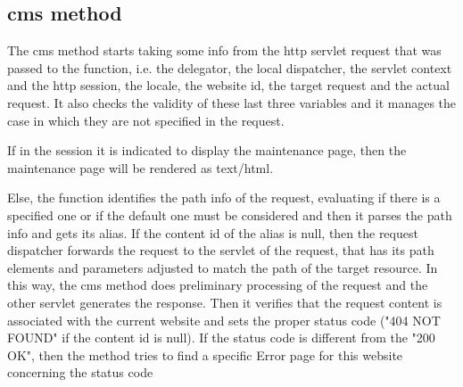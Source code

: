 \subsection{cms method}

The cms method starts taking some info from the http servlet request that was passed to the function, i.e. the delegator, the local dispatcher, the servlet context and the http session, the locale, the website id, the target request and the actual request. It also checks the validity of these last three variables and it manages the case in which they are not specified in the request.

If in the session it is indicated to display the maintenance page, then the maintenance page will be rendered as text/html.

Else, the function identifies the path info of the request, evaluating if there is a specified one or if the default one must be considered and then it parses the path info and gets its alias.
If the content id of the alias is null, then the request dispatcher forwards the request to the servlet of the request, that has its path elements and parameters adjusted to match the path of the target resource. In this way, the cms method does preliminary processing of the request and the other servlet generates the response. 
Then it verifies that the request content is associated with the current website and sets the proper status code ("404 NOT FOUND" if the content id is null). If the status code is different from the "200 OK", then the method tries to find a specific Error page for this website concerning the status code
